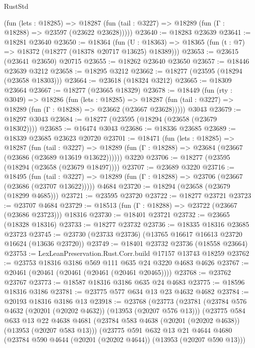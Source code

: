 \begin{lexlean}{RustStd}
\begin{coremodule}
      (fun (lets : @18285) =>
      @18287 (fun (tail : @3227) => @18289 (fun (Γ : @18288) => @23597 (@23622 @23628)))))
@23640 := @18283 @23639
@23641 := @18281 @23640
@23650 := @18364
    (fun (U : @18363) => @18365 (fun (t : @7) => @18372 (@18277 (@18378 @20717 @13625) @18389)))
@23653 := @23615 (@23641 @23650) @20715
@23655 := @18262 @23640 @23650
@23657 := @18446 @23639 @3212
@23658 := @18295 @3212
@23662 := @18277 (@23595 (@18294 (@23658 @18303)))
@23664 := @23618 (@18324 @3212)
@23665 := @18309 @23664
@23667 := @18277 (@23665 @18329)
@23678 := @18449
    (fun (rty : @3049) =>
    @18286
      (fun (lets : @18285) =>
      @18287 (fun (tail : @3227) => @18289 (fun (Γ : @18288) => @23662 (@23667 @23628)))))
    @3043
@23679 := @18297 @3043
@23684 := @18277 (@23595 (@18294 (@23658 (@23679 @18302))))
@23685 := @16474 @3043
@23686 := @18336 @23685
@23689 := @18339 @23685 @23623 @20720
@23701 := @18471
    (fun (lets : @18285) =>
    @18287
      (fun (tail : @3227) =>
      @18289 (fun (Γ : @18288) => @23684 (@23667 (@23686 (@23689 @13619 @13622))))))
    @3220
@23706 := @18277 (@23595 (@18294 (@23658 (@23679 @18497))))
@23707 := @23689 @3220
@23716 := @18495
    (fun (tail : @3227) => @18289 (fun (Γ : @18288) => @23706 (@23667 (@23686 (@23707 @13622)))))
    @4684
@23720 := @18294 (@23658 (@23679 (@18299 @4685)))
@23721 := @23595 @23720
@23722 := @18277 @23721
@23723 := @23707 @4684
@23729 := @18513 (fun (Γ : @18288) => @23722 (@23667 (@23686 @23723))) @18316
@23730 := @18401 @23721
@23732 := @23665 (@18328 @18316)
@23733 := @18277 @23732
@23736 := @18335 @18316 @23685 @23723
@23745 := @23730 (@23733 @23736) (@13765 @16617 @16613 @23720 @16624 (@13636 @23720))
@23749 := @18401 @23732 @23736 (@18558 @23664)
@23753 := LexLeanPreservation.Rust.Corr.build @17157 @13743 @18259
@23762 := @23753 @18316 @3186 @569 @111 @635 @24 @3220 @4683 @4626
@23767 := @20461 (@20461 (@20461 (@20461 (@20461 @20465))))
@23768 := @23762 @23767
@23773 := @18587 @18316 @3186 @635 @24 @4683
@23775 := @18596 @18316 @3186
@23781 := @23775 @577 @634 @13 @23 @4632 @4682
@23784 := @20193 @18316 @3186 @13
@23918 := @23768
    (@23773
      (@23781
        (@23784 @576 @4632 (@20201 (@20202 @4632)) (@13953 (@20207 @576 @13)))
        (@23775
          @584
          @633
          @13
          @22
          @4638
          @4681
          (@23784 @583 @4638 (@20201 (@20202 @4638)) (@13953 (@20207 @583 @13)))
          (@23775
            @591
            @632
            @13
            @21
            @4644
            @4680
            (@23784 @590 @4644 (@20201 (@20202 @4644)) (@13953 (@20207 @590 @13)))

\end{coremodule}
\end{lexlean}
